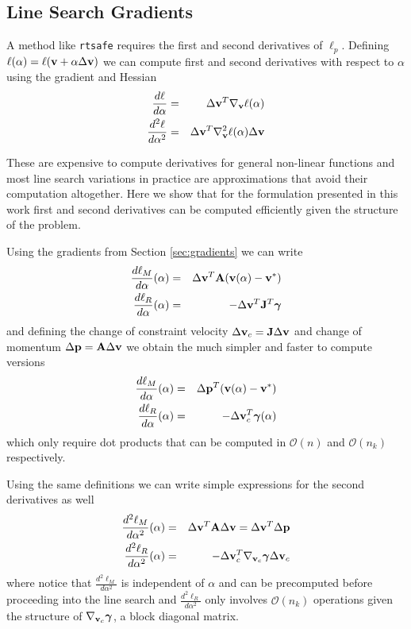 \subsection{Line Search Gradients}

A method like \verb;rtsafe; requires the first and second derivatives of
$\ell_p$. Defining $\ell(\alpha) = \ell({\mathbf{v}}+\alpha\Delta{\mathbf{v}})$ we can
compute first and second derivatives with respect to $\alpha$ using the gradient
and Hessian
\begin{eqnarray}
	\frac{d\ell}{d\alpha}&=&\Delta{\mathbf{v}}^T\nabla_{\mathbf{v}}\ell(\alpha)\nonumber\\
	\frac{d^2\ell}{d\alpha^2}&=&\Delta{\mathbf{v}}^T\nabla_{\mathbf{v}}^2\ell(\alpha)\Delta{\mathbf{v}}\nonumber
\end{eqnarray}

These are expensive to compute derivatives for general non-linear functions and
most line search variations in practice are approximations that avoid their
computation altogether. Here we show that for the formulation presented in this
work first and second derivatives can be computed efficiently given the
structure of the problem.

Using the gradients from Section \ref{sec:gradients} we can write
\begin{eqnarray}
	\frac{d\ell_M}{d\alpha}(\alpha)&=&\Delta{\mathbf{v}}^T{\mathbf{A}}({\mathbf{v}}(\alpha)-{\mathbf{v}}^*)\\
	\frac{d\ell_R}{d\alpha}(\alpha)&=&-\Delta{\mathbf{v}}^T{\mathbf{J}}^T{\bm\gamma}
\end{eqnarray}
and defining the change of constraint velocity
$\Delta{\mathbf{v}}_c={\mathbf{J}}\Delta{\mathbf{v}}$ and change of momentum $\Delta{\mathbf{p}} =
{\mathbf{A}}\Delta{\mathbf{v}}$ we obtain the much simpler and faster to compute versions
\begin{eqnarray}
	\frac{d\ell_M}{d\alpha}(\alpha)&=&\Delta{\mathbf{p}}^T({\mathbf{v}}(\alpha)-{\mathbf{v}}^*)\\
	\frac{d\ell_R}{d\alpha}(\alpha)&=&-\Delta{\mathbf{v}}_c^T{\bm\gamma}(\alpha)
\end{eqnarray}
which only require dot products that can be computed in $\mathcal{O}(n)$ and
$\mathcal{O}(n_k)$ respectively.

Using the same definitions we can write simple expressions for the second
derivatives as well
\begin{eqnarray}
	\frac{d^2\ell_M}{d\alpha^2}(\alpha)&=&\Delta{\mathbf{v}}^T{\mathbf{A}}\Delta{\mathbf{v}}=\Delta{\mathbf{v}}^T\Delta{\mathbf{p}}\\
	\frac{d^2\ell_R}{d\alpha^2}(\alpha)&=&-\Delta{\mathbf{v}}_c^T
	\nabla_{{\mathbf{v}}_c}{\bm\gamma}\Delta{\mathbf{v}}_c
\end{eqnarray}
where notice that $\frac{d^2\ell_M}{d\alpha^2}$ is independent of $\alpha$ and
can be precomputed before proceeding into the line search and
$\frac{d^2\ell_R}{d\alpha^2}$ only involves $\mathcal{O}(n_k)$ operations given
the structure of $\nabla_{{\mathbf{v}}_c}{\bm\gamma}$, a block diagonal matrix.


